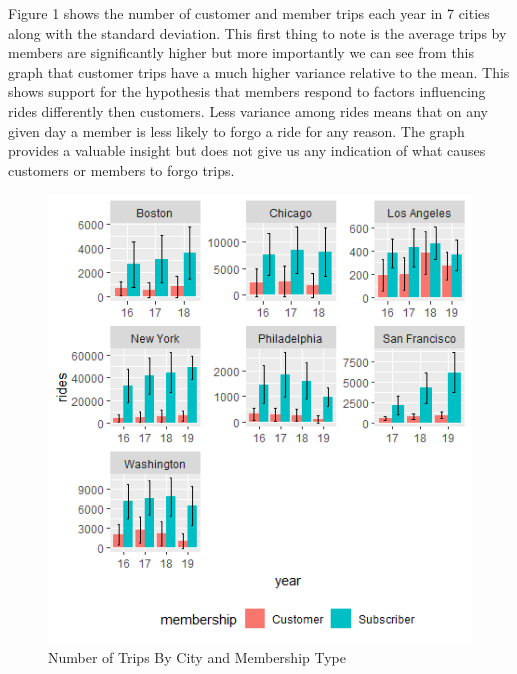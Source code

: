 \documentclass[12pt,letter paper]{article}
\begin{document}
Figure 1 shows the number of customer and member trips each year in 7 cities along with the standard deviation.  This first thing to note is the average trips by members are significantly higher but more importantly we can see from this graph that customer trips have a much higher variance relative to the mean.  This shows support for the hypothesis that members respond to factors influencing rides differently then customers.  Less variance among rides means that on any given day a member is less likely to forgo a ride for any reason.  The graph provides a valuable insight but does not give us any indication of what causes customers or members to forgo trips. \\
\begin{figure}[H]
\includegraphics[scale=1]{plot_1.png}
\caption{Number of Trips By City and Membership Type}
\end{figure}
\end{document}
